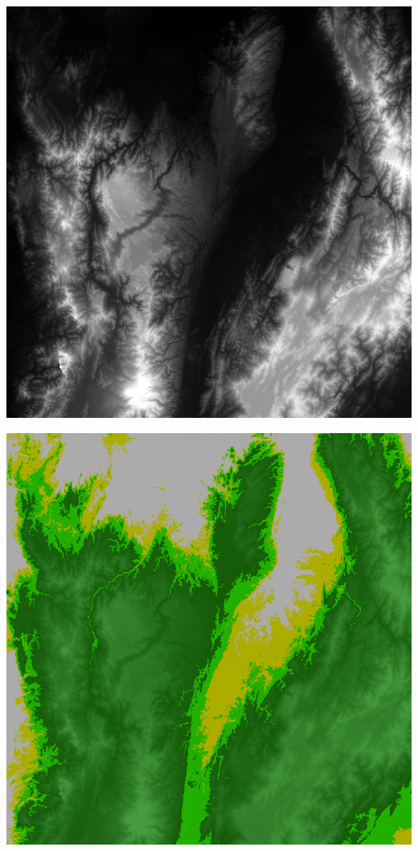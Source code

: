\documentclass[
  letterpaper,
  DIV=11,
  numbers=noendperiod]{scrreprt}
\begin{document}
\includegraphics{./F5/image50.png}

\includegraphics{./F5/image33.png}
\end{document}
